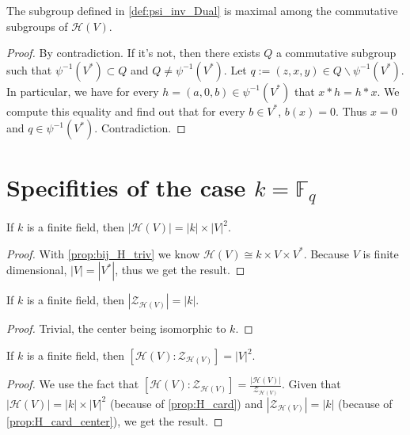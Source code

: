 \begin{proposition}
    \label{prop:psi_inv_Dual_max}
    \leanok

    The subgroup defined in \ref{def:psi_inv_Dual} is maximal among the
    commutative subgroups of $\mathcal{H}(V)$.
\end{proposition}
\begin{proof}
    \leanok 
    By contradiction. If it's not, then there exists $Q$ a commutative subgroup
    such that $\psi^{-1}(V^*)\subset Q$ and $Q\ne \psi^{-1}(V^*)$. Let $q:=(z,x,y)\in Q\backslash \psi^{-1}(V^*)$.
    In particular, we have for every $h=(a,0,b)\in \psi^{-1}(V^*)$ that $x*h=h*x$.
    We compute this equality and find out that for every $b\in V^*$, $b(x)=0$. Thus $x=0$ and $q\in \psi^{-1}(V^*)$.
    Contradiction.
\end{proof}

\section{Specifities of the case $k=\mathbb{F}_q$}

\begin{proposition}[Cardinality]
    \label{prop:H_card}
    \leanok
    If $k$ is a finite field, then $|\mathcal{H}(V)|=|k|\times|V|^2$.
\end{proposition}
\begin{proof}
    \leanok
    With \ref{prop:bij_H_triv} we know $\mathcal{H}(V)\cong k \times V \times V^*$.
    Because $V$ is finite dimensional, $|V|=|V^*|$, thus we get the result.
\end{proof}

\begin{proposition}
    \label{prop:H_card_center}
    \leanok
    If $k$ is a finite field, then $|\mathcal{Z}_{\mathcal{H}(V)}|=|k|$.
\end{proposition}
\begin{proof}
    \leanok
    Trivial, the center being isomorphic to $k$.
\end{proof}

\begin{theorem}
    \label{thm:H_index_center}
    \leanok

    If $k$ is a finite field, then $[\mathcal{H}(V):\mathcal{Z}_{\mathcal{H}(V)}]=|V|^2$.
\end{theorem}
\begin{proof}
    We use the fact that $[\mathcal{H}(V):\mathcal{Z}_{\mathcal{H}(V)}]=\frac{|\mathcal{H}(V)|}{\mathcal{Z}_{\mathcal{H}(V)}}$.
    Given that $|\mathcal{H}(V)|=|k|\times|V|^2$ (because of \ref{prop:H_card}) and $|\mathcal{Z}_{\mathcal{H}(V)}|=|k|$ (because of \ref{prop:H_card_center}), we get the result.
\end{proof}
